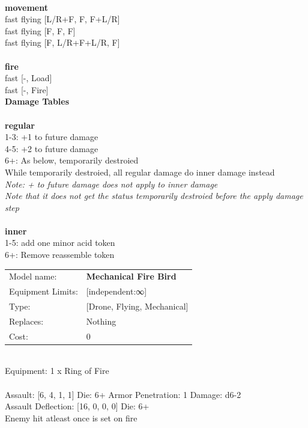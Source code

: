 \ \\ {\bf movement } \\
fast flying [L/R+F, F, F+L/R] \\
fast flying [F, F, F] \\
fast flying [F, L/R+F+L/R, F] \\
\ \\ {\bf fire } \\
fast [-, Load] \\
fast [-, Fire] \\


{\bf Damage Tables} \\
\ \\ {\bf regular } \\
1-3: +1 to future damage \\
4-5: +2 to future damage \\
6+: As below, temporarily destroied \\
While temporarily destroied, all regular damage do inner damage instead \\
{{\it Note: + to future damage does not apply to inner damage}} \\
{{\it Note that it does not get the status temporarily destroied before the apply damage step}} \\
\ \\ {\bf inner } \\
1-5: add one minor acid token \\
6+: Remove reassemble token \\


\noindent
\begin{tabular}{ll}
Model name: &{\bf Mechanical Fire Bird } \\
Equipment Limits: &[independent:∞] \\
Type: &[Drone, Flying, Mechanical] \\
Replaces: &Nothing \\
Cost: & 0\\
\end{tabular}
\ \\
Equipment: 1 x Ring of Fire \\
\ \\
Assault: [6, 4, 1, 1] Die: 6+ Armor Penetration: 1 Damage: d6-2 \\
Assault Deflection: [16, 0, 0, 0] Die: 6+\\
\indent Enemy hit atleast once is set on fire\\ 
 
\ \\

